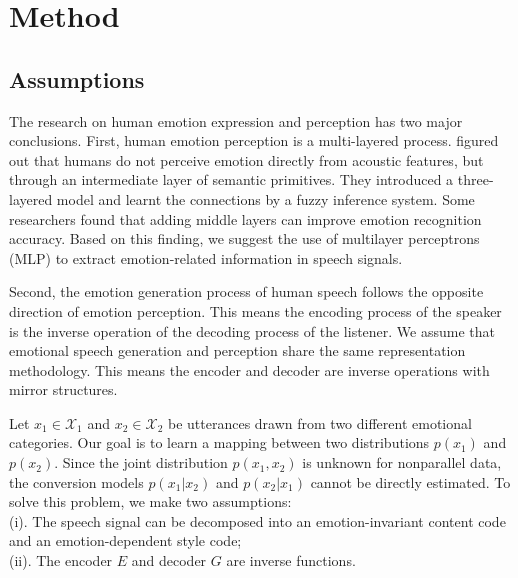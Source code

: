 \documentclass{article}
\begin{document}
\section{Method}
\label{sec:method}

\subsection{Assumptions}
The research on human emotion expression and perception has two major conclusions.
First, human emotion perception is a multi-layered process. \cite{huang2008three} figured out that humans do not perceive emotion directly from acoustic features, but through an intermediate layer of semantic primitives. They introduced a three-layered model and learnt the connections by a fuzzy inference system. Some researchers found that adding middle layers can improve emotion recognition accuracy. Based on this finding, we suggest the use of multilayer perceptrons (MLP) to extract emotion-related information in speech signals.

Second, the emotion generation process of human speech follows the opposite direction of emotion perception. This means the encoding process of the speaker is the inverse operation of the decoding process of the listener. We assume that emotional speech generation and perception share the same representation methodology. This means the encoder and decoder are inverse operations with mirror structures.

Let $x_1 \in \mathcal{X}_1$ and $x_2 \in \mathcal{X}_2$ be utterances drawn from two different emotional categories. Our goal is to learn a mapping between two distributions $p(x_1)$ and $p(x_2)$. Since the joint distribution $p(x_1, x_2)$ is unknown for nonparallel data, the conversion models $p(x_1|x_2)$ and $p(x_2|x_1)$ cannot be directly estimated. To solve this problem, we make two assumptions: \\
(i). The speech signal can be decomposed into an emotion-invariant content code and an emotion-dependent style code; \\
(ii). The encoder $E$ and decoder $G$ are inverse functions.
\end{document}
